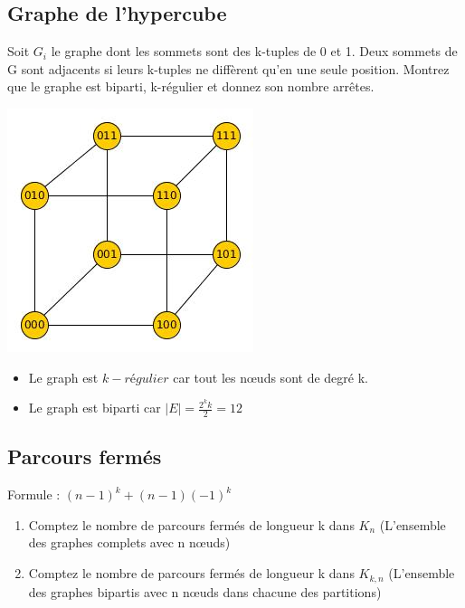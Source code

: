 \subsection{Graphe de l'hypercube}
Soit $G_{i}$ le graphe dont les sommets sont des k-tuples de 0 et 1. Deux sommets de G sont adjacents si leurs k-tuples ne diffèrent qu'en une seule position. Montrez que le graphe est biparti, k-régulier et donnez son nombre arrêtes.\\

\begin{solution}
\begin{minipage}{0.35\textwidth}
\begin{flushleft}
\includegraphics[scale=0.4]{graph_ape1_ex3}
\end{flushleft}
\end{minipage}
\begin{minipage}{0.65\textwidth}
\begin{flushright}
\begin{itemize}
\item Le graph est $k-régulier$ car tout les nœuds sont de degré k.
\item Le graph est biparti car $|E| = \frac{2^{k} k}{2} = 12$
\end{itemize}
\end{flushright}
\end{minipage}
\end{solution}

\subsection{Parcours fermés}
Formule : $(n-1)^{k} + (n-1)(-1)^{k}$
\begin{enumerate}
\item{Comptez le nombre de parcours fermés de longueur k dans $K_{n}$ (L'ensemble des graphes complets avec n nœuds)}
\item{Comptez le nombre de parcours fermés de longueur k dans $K_{k,n}$ (L'ensemble des graphes bipartis avec n nœuds dans chacune des partitions)}
\end{enumerate}

